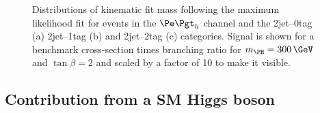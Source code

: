 \begin{figure}
\begin{center}

\end{center}
\caption[Distributions of kinematic fit mass following the maximum likelihood fit for
events in the $\etau$ channel.]{
Distributions of kinematic fit mass following the maximum likelihood fit for
events in the $\etau$ channel and the 2jet--0tag (a) 2jet--1tag (b) 
and 2jet--2tag (c) categories. Signal is shown for a benchmark
cross-section times branching ratio for $m_{\PH}=300\,\GeV$ and $\tan\beta=2$
and scaled by a factor of 10 to make it visible.}
\label{fig:PostFitMHetau}
\end{figure} 

\subsection{Contribution from a SM Higgs boson}

